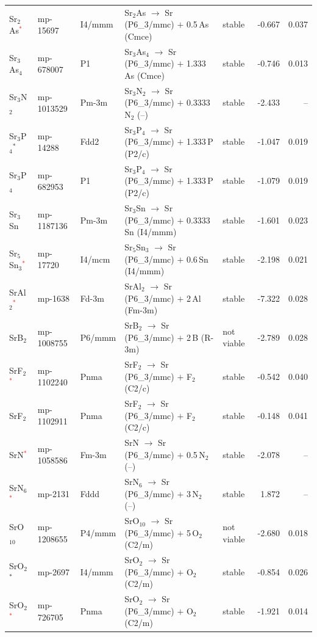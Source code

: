 \begin{longtable}{@{}ll l@{\hspace{4pt}} p{4.6cm} l@{\hspace{4pt}} rr@{}}
Sr$_{2}$As\textcolor{red}{$^*$} & mp-15697 & I4/mmm & Sr$_{2}$As $\to$ Sr (P6\_3/mmc) $+$ 0.5\,As (Cmce) & stable & -0.667 & 0.037 \\
Sr$_{3}$As$_{4}$ & mp-678007 & P1 & Sr$_{3}$As$_{4}$ $\to$ Sr (P6\_3/mmc) $+$ 1.333\,As (Cmce) & stable & -0.746 & 0.013 \\
Sr$_{3}$N$_{2}$ & mp-1013529 & Pm-3m & Sr$_{3}$N$_{2}$ $\to$ Sr (P6\_3/mmc) $+$ 0.3333\,N$_{2}$ (--) & stable & -2.433 & -- \\
Sr$_{3}$P$_{4}$$^*$ & mp-14288 & Fdd2 & Sr$_{3}$P$_{4}$ $\to$ Sr (P6\_3/mmc) $+$ 1.333\,P (P2/c) & stable & -1.047 & 0.019 \\
Sr$_{3}$P$_{4}$ & mp-682953 & P1 & Sr$_{3}$P$_{4}$ $\to$ Sr (P6\_3/mmc) $+$ 1.333\,P (P2/c) & stable & -1.079 & 0.019 \\
Sr$_{3}$Sn & mp-1187136 & Pm-3m & Sr$_{3}$Sn $\to$ Sr (P6\_3/mmc) $+$ 0.3333\,Sn (I4/mmm) & stable & -1.601 & 0.023 \\
Sr$_{5}$Sn$_{3}$\textcolor{red}{$^*$} & mp-17720 & I4/mcm & Sr$_{5}$Sn$_{3}$ $\to$ Sr (P6\_3/mmc) $+$ 0.6\,Sn (I4/mmm) & stable & -2.198 & 0.021 \\
SrAl$_{2}$\textcolor{red}{$^*$} & mp-1638 & Fd-3m & SrAl$_{2}$ $\to$ Sr (P6\_3/mmc) $+$ 2\,Al (Fm-3m) & stable & -7.322 & 0.028 \\
SrB$_{2}$ & mp-1008755 & P6/mmm & SrB$_{2}$ $\to$ Sr (P6\_3/mmc) $+$ 2\,B (R-3m) & not viable & -2.789 & 0.028 \\
SrF$_{2}$\textcolor{red}{$^*$} & mp-1102240 & Pnma & SrF$_{2}$ $\to$ Sr (P6\_3/mmc) $+$ F$_{2}$ (C2/c) & stable & -0.542 & 0.040 \\
SrF$_{2}$ & mp-1102911 & Pnma & SrF$_{2}$ $\to$ Sr (P6\_3/mmc) $+$ F$_{2}$ (C2/c) & stable & -0.148 & 0.041 \\
SrN\textcolor{red}{$^*$} & mp-1058586 & Fm-3m & SrN $\to$ Sr (P6\_3/mmc) $+$ 0.5\,N$_{2}$ (--) & stable & -2.078 & -- \\
SrN$_{6}$\textcolor{red}{$^*$} & mp-2131 & Fddd & SrN$_{6}$ $\to$ Sr (P6\_3/mmc) $+$ 3\,N$_{2}$ (--) & stable & 1.872 & -- \\
SrO$_{10}$ & mp-1208655 & P4/mmm & SrO$_{10}$ $\to$ Sr (P6\_3/mmc) $+$ 5\,O$_{2}$ (C2/m) & not viable & -2.680 & 0.018 \\
SrO$_{2}$$^*$ & mp-2697 & I4/mmm & SrO$_{2}$ $\to$ Sr (P6\_3/mmc) $+$ O$_{2}$ (C2/m) & stable & -0.854 & 0.026 \\
SrO$_{2}$\textcolor{red}{$^*$} & mp-726705 & Pnma & SrO$_{2}$ $\to$ Sr (P6\_3/mmc) $+$ O$_{2}$ (C2/m) & stable & -1.921 & 0.014 \\

\end{longtable}
